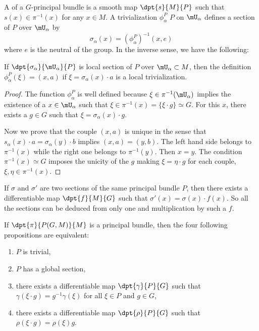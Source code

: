 												 A  of a $G$-principal bundle is a smooth map $\dpt{s}{M}{P}$ such that $s(x)\in\pi^{-1}(x)$ for any $x\in M$. A trivialization $\phi_{\alpha}^P$ $P$ on $\mU_{\alpha}$ defines a section of $P$ over $\mU_{\alpha}$ by
	\[
\sigma_{\alpha}(x)=(\phi_{\alpha}^P)^{-1}(x,e)
	\]
	where $e$ is the neutral of the group. In the inverse sense, we have the following:

	\begin{proposition}
	If $\dpt{\sigma_{\alpha}}{\mU_{\alpha}}{P}$ is local section of $P$ over $\mU_{\alpha}\subset M$, then the definition $\phi_{\alpha}^P(\xi)=(x,a)$ if $\xi=\sigma_{\alpha}(x)\cdot a$ is a local trivialization.
	\end{proposition}

	\begin{proof}
	The function $\phi_{\alpha}^P$ is well defined because $\xi\in\pi^{-1}(\mU_{\alpha})$ implies the existence of a $x\in\mU_{\alpha}$ such that $\xi\in\pi^{-1}(x)=\{\xi\cdot g\}\simeq G$. For this $x$, there exists a $g\in G$ such that $\xi=\sigma_{\alpha}(x)\cdot g$.

	Now we prove that the couple $(x,a)$ is unique in the sense that $s_{\alpha}(x)\cdot a=\sigma_{\alpha}(y)\cdot b$ implies $(x,a)=(y,b)$. The left hand side belongs to $\pi^{-1}(x)$ while the right one belongs to $\pi^{-1}(y)$. Then $x=y$. The condition $\pi^{-1}(x)\simeq G$ imposes the unicity of the $g$ making $\xi=\eta\cdot g$ for each couple, $\xi,\eta\in\pi^{-1}(x)$.
	\end{proof}

	If $\sigma$ and $\sigma'$ are two sections of the same principal bundle $P$, then there exists a differentiable map $\dpt{f}{M}{G}$ such that $\sigma'(x)=\sigma(x)\cdot f(x)$. So all the sections can be deduced from only one and multiplication by such a $f$.

	\begin{theorem}
	If $\dpt{\pi}{P(G,M)}{M}$ is a principal bundle, then the four following propositions are equivalent:
	\begin{enumerate}
	\item\label{enuymai} $P$ is trivial,
	\item\label{enuymaii} $P$ has a global section,
	\item\label{enuymaiii} there exists a differentiable map $\dpt{\gamma}{P}{G}$ such that $\gamma(\xi\cdot g)=g^{-1}\gamma(\xi)$ for all $\xi\in P$ and $g\in G$,
	\item\label{enuymaiv} there exists a differentiable map $\dpt{\rho}{P}{G}$ such that $\rho(\xi\cdot g)=\rho(\xi)g$.
	\end{enumerate}
	\label{ThoYPrincBTrivSect}
	\end{theorem}

